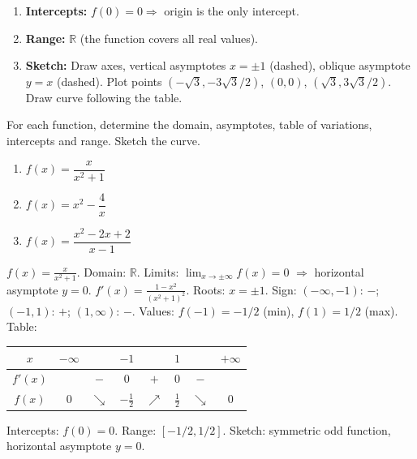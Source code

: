 \documentclass[11pt]{article}
\begin{document}
\begin{exoresolu}[Complete analysis of \(f(x)=\dfrac{x^3}{x^2-1}\)]
\begin{enumerate}
\begin{center}
\begin{tabular}{|c|ccccccccccccc|}
    \(f(x)\) & \(-\infty\) & \(\nearrow\) & \(-\frac{3\sqrt{3}}{2}\) & \(\searrow\) & \(+\infty\parallel-\infty\) & \(\searrow\) & \(0\) & \(\searrow\) & \(-\infty\parallel+\infty\) & \(\searrow\) & \(\frac{3\sqrt{3}}{2}\) & \(\nearrow\) & \(+\infty\) \\ \hline
    \end{tabular}
    \end{center}
  \item \textbf{Intercepts:} \(f(0)=0 \Rightarrow\) origin is the only intercept.
  \item \textbf{Range:} \(\mathbb{R}\) (the function covers all real values).
  \item \textbf{Sketch:} Draw axes, vertical asymptotes \(x=\pm1\) (dashed), oblique asymptote \(y=x\) (dashed). Plot points \((-\sqrt{3},-3\sqrt{3}/2)\), \((0,0)\), \((\sqrt{3},3\sqrt{3}/2)\). Draw curve following the table.
\end{enumerate}
\end{exoresolu}

\begin{exercice}
For each function, determine the domain, asymptotes, table of variations, intercepts and range. Sketch the curve.
\begin{enumerate}
  \item \(f(x) = \dfrac{x}{x^2+1}\)
  \item \(f(x) = x^2 - \dfrac{4}{x}\)
  \item \(f(x) = \dfrac{x^2-2x+2}{x-1}\)
\end{enumerate}
\end{exercice}

\begin{corrige}[Exercise 1]
\(f(x)=\frac{x}{x^2+1}\).
Domain: \(\mathbb{R}\).
Limits: \(\lim_{x\to\pm\infty} f(x)=0\) \(\Rightarrow\) horizontal asymptote \(y=0\).
\(f'(x)=\frac{1-x^2}{(x^2+1)^2}\). Roots: \(x=\pm1\).
Sign: \((-∞,-1)\): \(-\); \((-1,1)\): \(+\); \((1,∞)\): \(-\).
Values: \(f(-1)=-1/2\) (min), \(f(1)=1/2\) (max).
Table:
\begin{center}
\begin{tabular}{|c|ccccccc|}\hline
\(x\) & \(-\infty\) & & \(-1\) & & \(1\) & & \(+\infty\) \\ \hline
\(f'(x)\) & & \(-\) & \(0\) & \(+\) & \(0\) & \(-\) & \\ \hline
\(f(x)\) & \(0\) & \(\searrow\) & \(-\frac{1}{2}\) & \(\nearrow\) & \(\frac{1}{2}\) & \(\searrow\) & \(0\) \\ \hline
\end{tabular}
\end{center}
Intercepts: \(f(0)=0\).
Range: \([-1/2, 1/2]\).
Sketch: symmetric odd function, horizontal asymptote \(y=0\).
\end{corrige}
\end{document}
